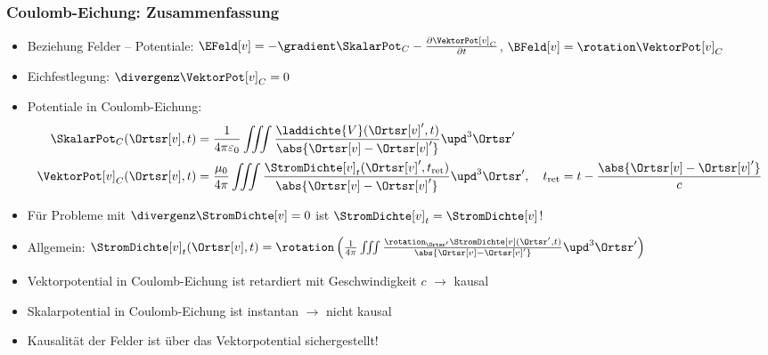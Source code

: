       \begin{frame}
  \frametitle{Coulomb-Eichung: Zusammenfassung}
  \begin{itemize}[<+->]
  \item Beziehung Felder -- Potentiale: $\EFeld[v] = -\gradient \SkalarPot_C - \frac{\partial \VektorPot[v]_C}{\partial t}$, $\BFeld[v] = \rotation \VektorPot[v]_C$
  \item Eichfestlegung: $\divergenz \VektorPot[v]_C = 0$
  \item Potentiale in Coulomb-Eichung:
    \begin{equation*}
      \begin{aligned}
        \SkalarPot_C (\Ortsr[v], t) &= \frac{1}{4\pi\varepsilon_0} \iiint \frac{\laddichte{V}(\Ortsr[v]^\prime, t)}{\abs{\Ortsr[v]-\Ortsr[v]^\prime}} \upd^3\Ortsr^\prime\\
        \VektorPot[v]_C(\Ortsr[v], t) &= \frac{\mu_0}{4\pi} \iiint \frac{\StromDichte[v]_t (\Ortsr[v]^\prime, t_{\text{ret}})}{\abs{\Ortsr[v]-\Ortsr[v]^\prime}} \upd^3\Ortsr^\prime, \quad t_{\text{ret}}= t - \frac{\abs{\Ortsr[v]-\Ortsr[v]^\prime}}{c}
        \end{aligned}
      \end{equation*}
    \item Für Probleme mit $\divergenz\StromDichte[v] = 0$ ist $\StromDichte[v]_t = \StromDichte[v]$!
    \item Allgemein: $\StromDichte[v]_t (\Ortsr[v], t) = \rotation \left( \frac{1}{4\pi} \iiint \frac{\rotation_{\Ortsr^\prime}\StromDichte[v](\Ortsr^\prime, t)}{\abs{\Ortsr[v]-\Ortsr[v]^\prime}} \upd^3\Ortsr^\prime \right)$
    \item Vektorpotential in Coulomb-Eichung ist retardiert mit Geschwindigkeit $c$ $\to$ \alert{kausal}
    \item Skalarpotential in Coulomb-Eichung ist instantan $\to$ \alert{nicht kausal}
      \item Kausalität der Felder ist über das Vektorpotential sichergestellt!
      \end{itemize}
  \end{frame}

